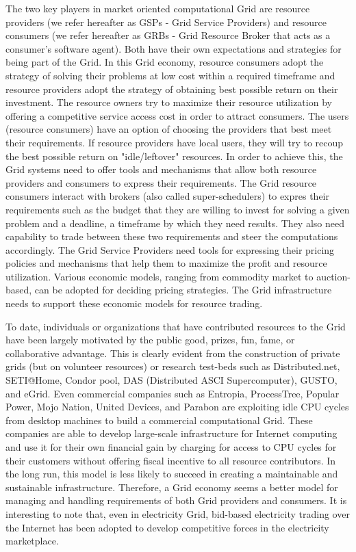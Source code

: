 \documentclass{article}
\begin{document}
The two key players in market oriented computational Grid are resource providers (we refer hereafter as GSPs - Grid Service Providers) and resource consumers (we refer hereafter as GRBs - Grid Resource Broker that acts as a consumer's software agent). Both have their own expectations and strategies for being part of the Grid. In this Grid economy, resource consumers adopt the strategy of solving their problems at low cost within a required timeframe and resource providers adopt the strategy of obtaining best possible return on their investment. The resource owners try to maximize their resource utilization by offering a competitive service access cost in order to attract consumers. The users (resource consumers) have an option of choosing the providers that best meet their requirements. If resource providers have local users, they will try to recoup the best possible return on "idle/leftover" resources. In order to achieve this, the Grid systems need to offer tools and mechanisms that allow both resource providers and consumers to express their requirements. The Grid resource consumers interact with brokers (also called super-schedulers) to expres their requirements such as the budget that they are willing to invest for solving a given problem and a deadline, a timeframe by which they need results. They also need capability to trade between these two requirements and steer the computations accordingly. The Grid Service Providers need tools for expressing their pricing policies and mechanisms that help them to maximize the profit and resource utilization. Various economic models, ranging from commodity market to auction-based, can be adopted for deciding pricing strategies. The Grid infrastructure needs to support these economic models for resource trading.

To date, individuals or organizations that have contributed resources to the Grid have been largely motivated by the public good, prizes, fun, fame, or collaborative advantage. This is clearly evident from the construction of private grids (but on volunteer resources) or research test-beds such as Distributed.net, SETI@Home, Condor pool, DAS (Distributed ASCI Supercomputer), GUSTO, and eGrid. Even commercial companies such as Entropia, ProcessTree, Popular Power, Mojo Nation, United Devices, and Parabon are exploiting idle CPU cycles from desktop machines to build a commercial computational Grid. These companies are able to develop large-scale infrastructure for Internet computing and use it for their own financial gain by charging for access to CPU cycles for their customers without offering fiscal incentive to all resource contributors. In the long run, this model is less likely to succeed in creating a maintainable and sustainable infrastructure. Therefore, a Grid economy seems a better model for managing and handling requirements of both Grid providers and consumers. It is interesting to note that, even in electricity Grid, bid-based electricity trading over the Internet has been adopted to develop competitive forces in the electricity marketplace.
\end{document}
